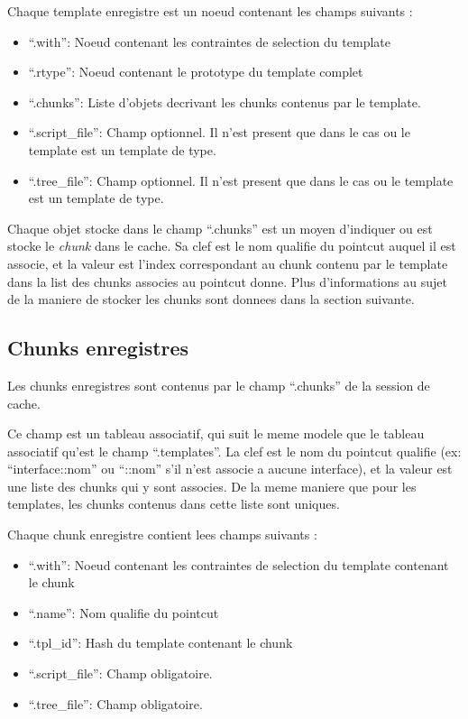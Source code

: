 \documentclass[french]{rtxreport}
\begin{document}
Chaque template enregistre est un noeud contenant les champs suivants :
\begin{itemize}
    \item ``.with'': Noeud contenant les contraintes de selection du template
    \item ``.rtype'': Noeud contenant le prototype du template complet
    \item ``.chunks'': Liste d'objets decrivant les chunks contenus par le
        template.
    \item ``.script\_file'': Champ optionnel. Il n'est present que dans le cas
        ou le template est un template de type.
    \item ``.tree\_file'': Champ optionnel. Il n'est present que dans le cas
        ou le template est un template de type.
\end{itemize}

Chaque objet stocke dans le champ ``.chunks'' est un moyen d'indiquer ou est
stocke le \emph{chunk} dans le cache. Sa clef est le nom qualifie du pointcut
auquel il est associe, et la valeur est l'index correspondant au chunk contenu
par le template dans la list des chunks associes au pointcut donne. Plus
d'informations au sujet de la maniere de stocker les chunks sont donnees dans
la section suivante.


\subsection{Chunks enregistres}

Les chunks enregistres sont contenus par le champ ``.chunks'' de la session de
cache.

Ce champ est un tableau associatif, qui suit le meme modele que le tableau
associatif qu'est le champ ``.templates''. La clef est le nom du pointcut
qualifie (ex: ``interface::nom'' ou ``::nom'' s'il n'est associe a aucune
interface), et la valeur est une liste des chunks qui y sont associes. De la
meme maniere que pour les templates, les chunks contenus dans cette liste sont
uniques.

Chaque chunk enregistre contient lees champs suivants :
\begin{itemize}
    \item ``.with'': Noeud contenant les contraintes de selection du template
        contenant le chunk
    \item ``.name'': Nom qualifie du pointcut
    \item ``.tpl\_id'': Hash du template contenant le chunk
    \item ``.script\_file'': Champ obligatoire.
    \item ``.tree\_file'': Champ obligatoire.
\end{itemize}
\end{document}
